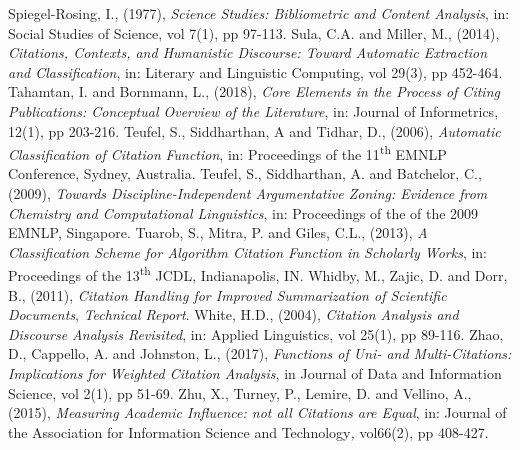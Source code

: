 \documentclass[runningheads,a4paper]{llncs}
\begin{document}
\begin{thebibliography}{4}
 Spiegel-Rosing, I., (1977), {\em Science Studies: Bibliometric and Content Analysis}, in: Social Studies of Science, vol 7(1), pp 97-113.
 Sula, C.A. and Miller, M., (2014), {\em Citations, Contexts, and Humanistic Discourse: Toward Automatic Extraction and Classification}, in: Literary and Linguistic Computing, vol 29(3), pp 452-464.
 Tahamtan, I. and Bornmann, L., (2018), {\em Core Elements in the Process of Citing Publications: Conceptual Overview of the Literature}, in: Journal of Informetrics, 12(1), pp 203-216.
 Teufel, S., Siddharthan, A and Tidhar, D., (2006), {\em Automatic Classification of Citation }{\em Function}, in: Proceedings of the 11\textsuperscript{th} EMNLP Conference, Sydney, Australia.
 Teufel, S., Siddharthan, A. and Batchelor, C., (2009), {\em Towards Discipline-Independent Argumentative Zoning: Evidence from Chemistry and Computational Linguistics}, in: Proceedings of the of the 2009 EMNLP, Singapore.
 Tuarob, S., Mitra, P. and Giles, C.L., (2013), {\em A Classification Scheme for Algorithm Citation Function in Scholarly Works}, in: Proceedings of the 13\textsuperscript{th} JCDL, Indianapolis, IN.
 Whidby, M., Zajic, D. and Dorr, B., (2011), {\em Citation Handling for Improved Summarization of Scientific Documents}, {\em Technical Report}.
 White, H.D., (2004), {\em Citation Analysis and Discourse Analysis Revisited}, in: Applied Linguistics, vol 25(1), pp 89-116.
 Zhao, D., Cappello, A. and Johnston, L., (2017), {\em Functions of Uni- and Multi-Citations: Implications for Weighted Citation Analysis}, in Journal of Data and Information Science, vol 2(1), pp 51-69.
 Zhu, X., Turney, P., Lemire, D. and Vellino, A.,(2015), {\em Measuring Academic Influence: not all Citations are Equal}, in: Journal of the Association for Information Science and Technology{\em , }vol{\em }66(2), pp 408-427.

\end{thebibliography}
\end{document}
